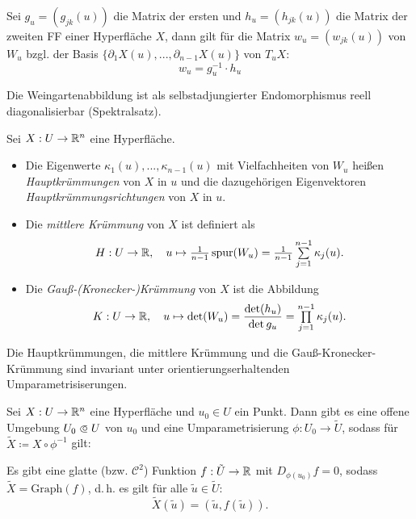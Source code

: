 \documentclass{cheat-sheet}
\newcommand{\spur}{\mathrm{spur}}
\newcommand{\Graph}{\mathrm{Graph}}
\let\myProd\prod
\DeclareMathOperator*{\textprod}{{\textstyle \myProd}}
\renewcommand{\prod}{\textprod}
\let\mySum\sum
\DeclareMathOperator*{\textsum}{{\textstyle \mySum}}
\renewcommand{\sum}{\textsum\limits}
\newcommand\opn{\mathrel{\ooalign{$\subset$\cr
  \hidewidth\raise.1ex\hbox{$\circ\mkern.5mu$}\cr}}}
\begin{document}
\begin{satz}
  Sei $g_u = (g_{jk}(u))$ die Matrix der ersten und $h_u = (h_{jk}(u))$ die Matrix der zweiten FF einer Hyperfläche $X$, dann gilt für die Matrix $w_u = (w_{jk}(u))$ von $W_u$ bzgl. der Basis $\{ \partial_1 X(u), ..., \partial_{n-1} X(u) \}$ von $T_u X$:
  \[ w_u = g_u^{-1} \cdot h_u \]
\end{satz}

\begin{bem}
  Die Weingartenabbildung ist als selbstadjungierter Endomorphismus reell diagonalisierbar (Spektralsatz).
\end{bem}

\begin{defn}
  Sei $X : U \to \mathbb{R}^n$ eine Hyperfläche.
  \begin{itemize}
    \item Die Eigenwerte $\kappa_1(u), ..., \kappa_{n-1}(u)$ mit Vielfachheiten von $W_u$ heißen \emph{Hauptkrümmungen} von $X$ in $u$ und die dazugehörigen Eigenvektoren \emph{Hauptkrümmungsrichtungen} von $X$ in $u$.
    \item Die \emph{mittlere Krümmung} von $X$ ist definiert als
    \[ H : U \to \R, \quad u \mapsto \tfrac{1}{n-1} \, \spur(W_u) = \tfrac{1}{n-1} \sum_{j=1}^{n-1} \kappa_j(u). \]
    \item Die \emph{Gauß-(Kronecker-)Krümmung} von $X$ ist die Abbildung
    \[ K : U \to \R, \quad u \mapsto \det(W_u) = \frac{\det(h_u)}{\det{g_u}} = \prod_{j=1}^{n-1} \kappa_j(u). \]
  \end{itemize}
\end{defn}

\begin{satz}
  Die Hauptkrümmungen, die mittlere Krümmung und die Gauß-Kronecker-Krümmung sind invariant unter orientierungserhaltenden Umparametrisiserungen.
\end{satz}


\begin{satz}
  Sei $X : U \to \mathbb{R}^n$ eine Hyperfläche und $u_0 \in U$ ein Punkt. Dann gibt es eine offene Umgebung $U_0 \opn U$ von $u_0$ und eine Umparametrisierung $\phi : U_0 \to \tilde{U}$, sodass für $\tilde{X} \coloneqq X \circ \phi^{-1}$ gilt:

  Es gibt eine glatte (bzw. $\mathcal{C}^2$) Funktion $f : \tilde{U} \to \mathbb{R}$ mit $D_{\phi(u_0)} f = 0$, sodass $\tilde{X} = \Graph(f)$, d.\,h. es gilt für alle $\tilde{u} \in \tilde{U}$:
  \[ \tilde{X}(\tilde{u}) = (\tilde{u}, f(\tilde{u})). \]
\end{satz}
\end{document}
